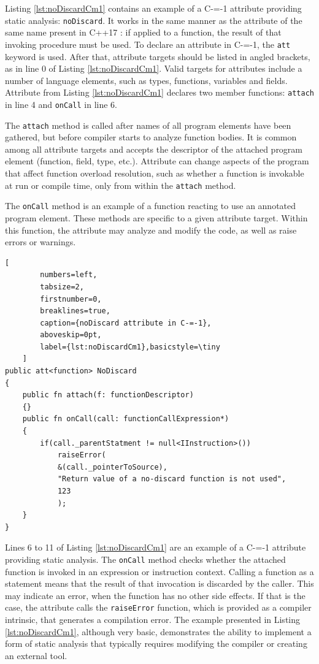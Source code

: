 Listing \ref{lst:noDiscardCm1} contains an example of a C-=-1 attribute providing static analysis: \lstinline{noDiscard}.
It works in the same manner as the attribute of the same name present in C++17 \cite{ISO:cpp17}: if applied to a function, the result of that invoking procedure must be used.
To declare an attribute in C-=-1, the \lstinline{att} keyword is used.
After that, attribute targets should be listed in angled brackets, as in line 0 of Listing \ref{lst:noDiscardCm1}.
Valid targets for attributes include a number of language elements, such as types, functions, variables and fields. Attribute from Listing \ref{lst:noDiscardCm1} declares two member functions: \lstinline{attach} in line 4 and \lstinline{onCall} in line 6.

The \lstinline{attach} method is called after names of all program elements have been gathered, but before compiler starts to analyze function bodies.
It is common among all attribute targets and accepts the descriptor of the attached program element (function, field, type, etc.).
Attribute can change aspects of the program that affect function overload resolution, such as  whether a function is invokable at run or compile time, only from within the \lstinline{attach} method.

The \lstinline{onCall} method is an example of a function reacting to use an annotated program element.
These methods are specific to a given attribute target.
Within this function, the attribute may analyze and modify the code, as well as raise errors or warnings.

\begin{minipage}{\linewidth}

	\begin{lstlisting}[
		numbers=left,
		tabsize=2,
		firstnumber=0,
		breaklines=true,
		caption={noDiscard attribute in C-=-1},
		aboveskip=0pt,
		label={lst:noDiscardCm1},basicstyle=\tiny
	]
public att<function> NoDiscard
{
	public fn attach(f: functionDescriptor)
	{}
	public fn onCall(call: functionCallExpression*)
	{
		if(call._parentStatment != null<IInstruction>())
			raiseError(
			&(call._pointerToSource),
			"Return value of a no-discard function is not used",
			123
			);
	}
}
  \end{lstlisting}
\end{minipage}



Lines 6 to 11 of Listing \ref{lst:noDiscardCm1} are an example of a C-=-1 attribute providing static analysis.
The \lstinline{onCall} method checks whether the attached function is invoked in an expression or instruction context.
Calling a function as a statement means that the result of that invocation is discarded by the caller.
This may indicate an error, when the function has no other side effects.
If that is the case, the attribute calls the \lstinline{raiseError} function, which is provided as a compiler intrinsic, that generates a compilation error.
The example presented in Listing \ref{lst:noDiscardCm1}, although very basic, demonstrates the ability to implement a form of static analysis that typically requires modifying the compiler or creating an external tool.

